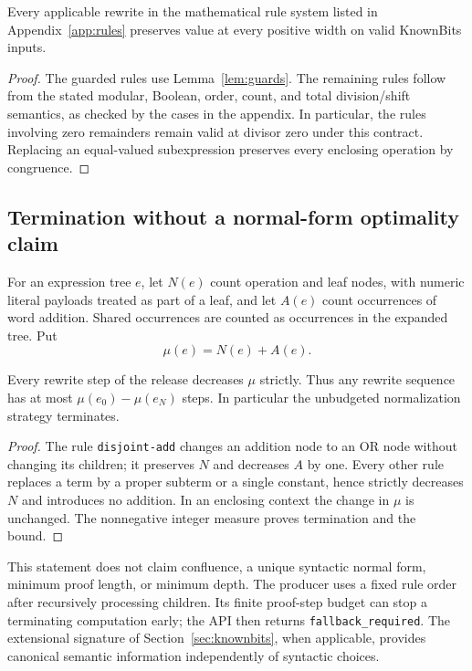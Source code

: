 \begin{proposition}\label{prop:rules}
Every applicable rewrite in the mathematical rule system listed in Appendix~\ref{app:rules} preserves value at every positive width on valid KnownBits inputs.
\end{proposition}
\begin{proof}
The guarded rules use Lemma~\ref{lem:guards}. The remaining rules follow from the stated modular, Boolean, order, count, and total division/shift semantics, as checked by the cases in the appendix. In particular, the rules involving zero remainders remain valid at divisor zero under this contract. Replacing an equal-valued subexpression preserves every enclosing operation by congruence.
\end{proof}

\subsection{Termination without a normal-form optimality claim}
For an expression tree $e$, let $N(e)$ count operation and leaf nodes, with numeric literal payloads treated as part of a leaf, and let $A(e)$ count occurrences of word addition. Shared occurrences are counted as occurrences in the expanded tree. Put
\[
\mu(e)=N(e)+A(e).
\]

\begin{proposition}\label{prop:termination}
Every rewrite step of the release decreases $\mu$ strictly. Thus any rewrite sequence has at most $\mu(e_0)-\mu(e_N)$ steps. In particular the unbudgeted normalization strategy terminates.
\end{proposition}
\begin{proof}
The rule \texttt{disjoint-add} changes an addition node to an OR node without changing its children; it preserves $N$ and decreases $A$ by one. Every other rule replaces a term by a proper subterm or a single constant, hence strictly decreases $N$ and introduces no addition. In an enclosing context the change in $\mu$ is unchanged. The nonnegative integer measure proves termination and the bound.
\end{proof}

This statement does not claim confluence, a unique syntactic normal form, minimum proof length, or minimum depth. The producer uses a fixed rule order after recursively processing children. Its finite proof-step budget can stop a terminating computation early; the API then returns \texttt{fallback\_required}. The extensional signature of Section~\ref{sec:knownbits}, when applicable, provides canonical semantic information independently of syntactic choices.

